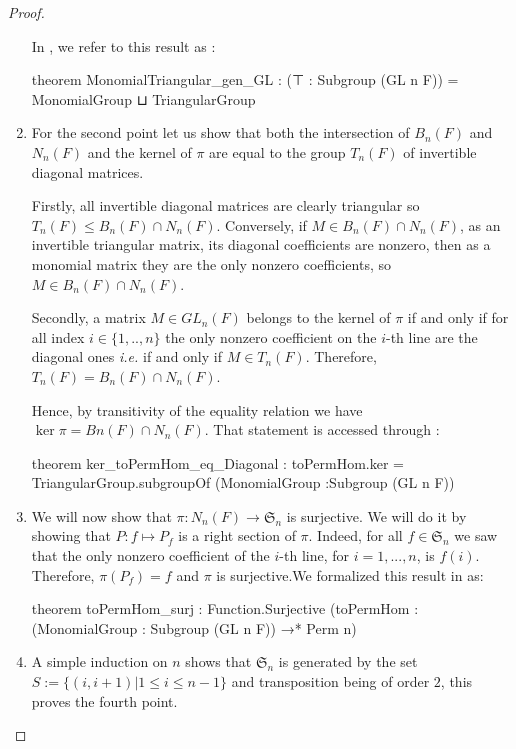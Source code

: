 \begin{proof}
\begin{enumerate}
In \Lean, we refer to this result as :
\begin{leancode}
theorem MonomialTriangular_gen_GL : 
    (⊤ : Subgroup (GL n F)) = MonomialGroup ⊔ TriangularGroup
\end{leancode}


\item \label{GL2} For the second point let us show that both the intersection of $B_n(F)$ and $N_n\left( F \right)$ and the kernel of $\pi$ are equal to the group $T_n\left( F \right)$ of invertible diagonal matrices. 

    Firstly, all invertible diagonal matrices are clearly triangular so $T_n\left( F \right) \le  B_n\left( F \right) \cap N_n(F)$. Conversely, if $M \in B_n(F) \cap  N_n(F)$, as an invertible triangular matrix, its diagonal coefficients are nonzero, then as a monomial matrix they are the only nonzero coefficients, so $M \in B_n(F) \cap N_n(F)$.

    Secondly, a matrix $M \in GL_n(F)$ belongs to the kernel of $\pi$ if and only if for all index $i \in  \{ 1,..,n\}$ the only nonzero coefficient on the $i$-th line are the diagonal ones \textit{i.e.} if and only if $M \in T_n\left( F \right)$. Therefore, $T_n\left( F \right) = B_n\left( F \right) \cap N_n(F)$.

    Hence, by transitivity of the equality relation we have $\ker \pi = Bn(F) \cap N_n(F)$. That statement is accessed through :
    \begin{leancode}
theorem ker_toPermHom_eq_Diagonal :
  toPermHom.ker = TriangularGroup.subgroupOf (MonomialGroup :Subgroup (GL n F))
    \end{leancode}
    

\item \label{GL3}We will now show that $\pi : N_n(F) \to \mathfrak{S}_n$ is surjective. We will do it by showing that $P : f \mapsto P_f $ is a right section of $\pi$. Indeed, for all $f \in \mathfrak{S}_n$ we saw that the only nonzero coefficient of the $i$-th line, for $i=1,...,n$, is $f(i)$. Therefore, $\pi\left( P_f \right) = f$ and $\pi$ is surjective.We formalized this result in \Lean as:
\begin{leancode}
theorem toPermHom_surj :
  Function.Surjective (toPermHom : (MonomialGroup : Subgroup (GL n F)) →* Perm n)
\end{leancode}

\item A simple induction on $n$ shows that $\mathfrak{S}_n$ is generated by the set $S:= \{\left( i,i+1 \right) | 1\le i\le n-1\}$ and transposition being of order $2$, this proves the fourth point. 


\end{enumerate}
\end{proof}
